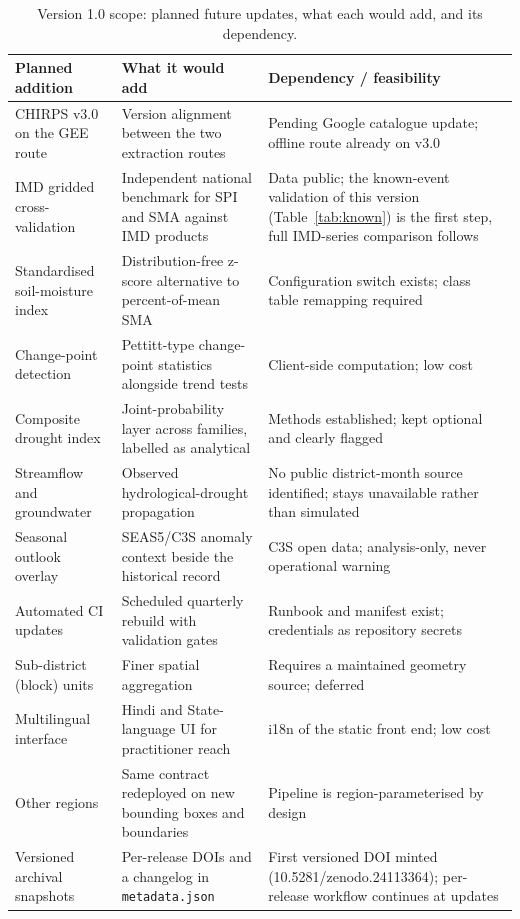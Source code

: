 \documentclass[10pt,a4paper]{article}
\begin{document}
\begin{table}[t]
\caption{Version 1.0 scope: planned future updates, what each would add, and its dependency.}
\label{tab:roadmap}
\footnotesize
\begin{tabularx}{\textwidth}{@{}p{}X p{}@{}}
\toprule
Planned addition & What it would add & Dependency / feasibility \\
\midrule
CHIRPS v3.0 on the GEE route & Version alignment between the two extraction routes & Pending Google catalogue update; offline route already on v3.0 \\
IMD gridded cross-validation & Independent national benchmark for SPI and SMA against IMD products\citep{Pai2014,Srivastava2009} & Data public; the known-event validation of this version (Table~\ref{tab:known}) is the first step, full IMD-series comparison follows \\
Standardised soil-moisture index & Distribution-free z-score alternative to percent-of-mean SMA & Configuration switch exists; class table remapping required \\
Change-point detection & Pettitt-type\citep{Pettitt1979} change-point statistics alongside trend tests & Client-side computation; low cost \\
Composite drought index & Joint-probability layer across families\citep{HaoSingh2015}, labelled as analytical & Methods established; kept optional and clearly flagged \\
Streamflow and groundwater & Observed hydrological-drought propagation & No public district-month source identified; stays unavailable rather than simulated \\
Seasonal outlook overlay & SEAS5/C3S anomaly context beside the historical record & C3S open data; analysis-only, never operational warning \\
Automated CI updates & Scheduled quarterly rebuild with validation gates & Runbook and manifest exist; credentials as repository secrets \\
Sub-district (block) units & Finer spatial aggregation & Requires a maintained geometry source; deferred \\
Multilingual interface & Hindi and State-language UI for practitioner reach & i18n of the static front end; low cost \\
Other regions & Same contract redeployed on new bounding boxes and boundaries & Pipeline is region-parameterised by design \\
Versioned archival snapshots & Per-release DOIs and a changelog in \texttt{metadata.json} & First versioned DOI minted (10.5281/zenodo.24113364); per-release workflow continues at updates \\
\bottomrule
\end{tabularx}
\end{table}
\end{document}

